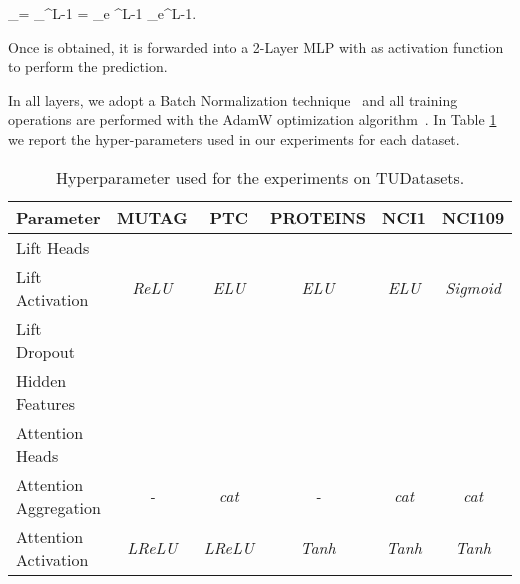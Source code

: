 \documentclass{article}
\begin{document}
    _{}= _{^{L-1}} = \sum_{e \in {}^{L-1}} _{e}^{L-1}.



Once  is obtained, it is forwarded into a 2-Layer MLP with  as activation function to perform the prediction.

In all layers, we adopt a Batch Normalization technique~\cite{ioffe2015batch} and all training operations are performed with the AdamW optimization algorithm~\cite{loshchilov2017decoupled}. In Table \ref{tab:hyper-params} we report the hyper-parameters used in our experiments for each dataset.

\begin{table}[t]
\centering
\caption{Hyperparameter used for the experiments on TUDatasets.}
\label{tab:hyper-params}
\begin{tabular}{lccccc}
\toprule 
\multicolumn{1}{l}{Parameter}  & \multicolumn{1}{c}{MUTAG} & \multicolumn{1}{c}{PTC} & \multicolumn{1}{c}{PROTEINS} & \multicolumn{1}{c}{NCI1} & \multicolumn{1}{c}{NCI109} \\ \bottomrule
Lift Heads                   & \multicolumn{1}{c}{} & \multicolumn{1}{c}{} & \multicolumn{1}{c}{} & \multicolumn{1}{c}{} & \multicolumn{1}{c}{} \\
Lift Activation            & \multicolumn{1}{c}{\textit{ReLU}} & \multicolumn{1}{c}{\textit{ELU}} & \multicolumn{1}{c}{\textit{ELU}} & \multicolumn{1}{c}{\textit{ELU}} & \multicolumn{1}{c}{\textit{Sigmoid}} \\
Lift Dropout                    & \multicolumn{1}{c}{} & \multicolumn{1}{c}{} & \multicolumn{1}{c}{} & \multicolumn{1}{c}{} & \multicolumn{1}{c}{}\\
Hidden Features           & \multicolumn{1}{c}{} & \multicolumn{1}{c}{} & \multicolumn{1}{c}{} & \multicolumn{1}{c}{} & \multicolumn{1}{c}{} \\
Attention Heads             & \multicolumn{1}{c}{} & \multicolumn{1}{c}{} & \multicolumn{1}{c}{} & \multicolumn{1}{c}{} & \multicolumn{1}{c}{} \\
Attention Aggregation      & \multicolumn{1}{c}{\textit{-}} & \multicolumn{1}{c}{\textit{cat}} & \multicolumn{1}{c}{\textit{-}} & \multicolumn{1}{c}{\textit{cat}} & \multicolumn{1}{c}{\textit{cat}} \\
Attention Activation       & \multicolumn{1}{c}{\textit{LReLU}} & \multicolumn{1}{c}{\textit{LReLU}} & \multicolumn{1}{c}{\textit{Tanh}} & \multicolumn{1}{c}{\textit{Tanh}} & \multicolumn{1}{c}{\textit{Tanh}} \\

\end{tabular}
\end{table}
\end{document}
